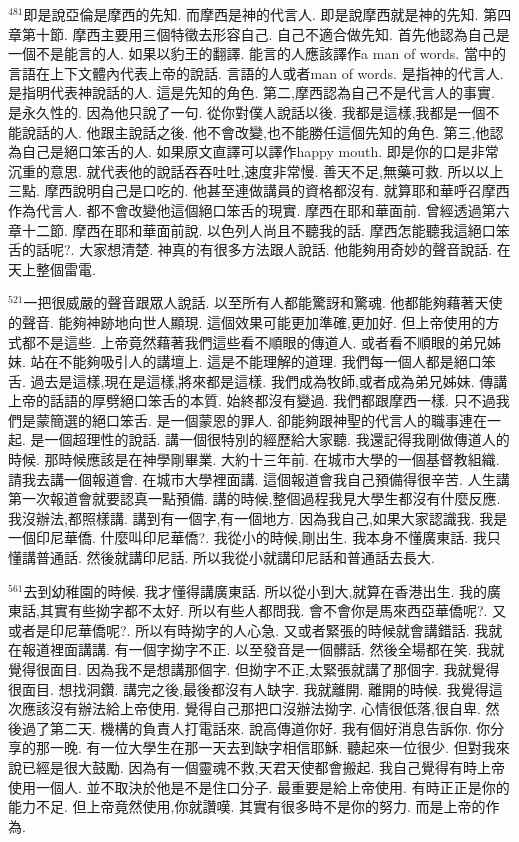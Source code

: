 \documentclass{book}
\begin{document}
$^{481}$即是說亞倫是摩西的先知.
而摩西是神的代言人.
即是說摩西就是神的先知.
第四章第十節.
摩西主要用三個特徵去形容自己.
自己不適合做先知.
首先他認為自己是一個不是能言的人.
如果以豹王的翻譯.
能言的人應該譯作a man of words.
當中的言語在上下文體內代表上帝的說話.
言語的人或者man of words.
是指神的代言人.
是指明代表神說話的人.
這是先知的角色.
第二,摩西認為自己不是代言人的事實.
是永久性的.
因為他只說了一句.
從你對僕人說話以後.
我都是這樣,我都是一個不能說話的人.
他跟主說話之後.
他不會改變,也不能勝任這個先知的角色.
第三,他認為自己是絕口笨舌的人.
如果原文直譯可以譯作happy mouth.
即是你的口是非常沉重的意思.
就代表他的說話吞吞吐吐,速度非常慢.
善天不足,無藥可救.
所以以上三點.
摩西說明自己是口吃的.
他甚至連做講員的資格都沒有.
就算耶和華呼召摩西作為代言人.
都不會改變他這個絕口笨舌的現實.
摩西在耶和華面前.
曾經透過第六章十二節.
摩西在耶和華面前說.
以色列人尚且不聽我的話.
摩西怎能聽我這絕口笨舌的話呢?.
大家想清楚.
神真的有很多方法跟人說話.
他能夠用奇妙的聲音說話.
在天上整個雷電.

$^{521}$一把很威嚴的聲音跟眾人說話.
以至所有人都能驚訝和驚魂.
他都能夠藉著天使的聲音.
能夠神跡地向世人顯現.
這個效果可能更加準確,更加好.
但上帝使用的方式都不是這些.
上帝竟然藉著我們這些看不順眼的傳道人.
或者看不順眼的弟兄姊妹.
站在不能夠吸引人的講壇上.
這是不能理解的道理.
我們每一個人都是絕口笨舌.
過去是這樣,現在是這樣,將來都是這樣.
我們成為牧師,或者成為弟兄姊妹.
傳講上帝的話語的厚劈絕口笨舌的本質.
始終都沒有變過.
我們都跟摩西一樣.
只不過我們是蒙簡選的絕口笨舌.
是一個蒙恩的罪人.
卻能夠跟神聖的代言人的職事連在一起.
是一個超理性的說話.
講一個很特別的經歷給大家聽.
我還記得我剛做傳道人的時候.
那時候應該是在神學剛畢業.
大約十三年前.
在城市大學的一個基督教組織.
請我去講一個報道會.
在城市大學裡面講.
這個報道會我自己預備得很辛苦.
人生講第一次報道會就要認真一點預備.
講的時候,整個過程我見大學生都沒有什麼反應.
我沒辦法,都照樣講.
講到有一個字,有一個地方.
因為我自己,如果大家認識我.
我是一個印尼華僑.
什麼叫印尼華僑?.
我從小的時候,剛出生.
我本身不懂廣東話.
我只懂講普通話.
然後就講印尼話.
所以我從小就講印尼話和普通話去長大.

$^{561}$去到幼稚園的時候.
我才懂得講廣東話.
所以從小到大,就算在香港出生.
我的廣東話,其實有些拗字都不太好.
所以有些人都問我.
會不會你是馬來西亞華僑呢?.
又或者是印尼華僑呢?.
所以有時拗字的人心急.
又或者緊張的時候就會講錯話.
我就在報道裡面講講.
有一個字拗字不正.
以至發音是一個髒話.
然後全場都在笑.
我就覺得很面目.
因為我不是想講那個字.
但拗字不正,太緊張就講了那個字.
我就覺得很面目.
想找洞鑽.
講完之後,最後都沒有人缺字.
我就離開.
離開的時候.
我覺得這次應該沒有辦法給上帝使用.
覺得自己那把口沒辦法拗字.
心情很低落,很自卑.
然後過了第二天.
機構的負責人打電話來.
說高傳道你好.
我有個好消息告訴你.
你分享的那一晚.
有一位大學生在那一天去到缺字相信耶穌.
聽起來一位很少.
但對我來說已經是很大鼓勵.
因為有一個靈魂不救,天君天使都會搬起.
我自己覺得有時上帝使用一個人.
並不取決於他是不是住口分子.
最重要是給上帝使用.
有時正正是你的能力不足.
但上帝竟然使用,你就讚嘆.
其實有很多時不是你的努力.
而是上帝的作為.
\end{document}
